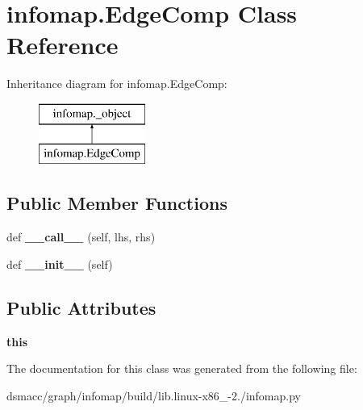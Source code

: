 \hypertarget{classinfomap_1_1EdgeComp}{}\section{infomap.\+Edge\+Comp Class Reference}
\label{classinfomap_1_1EdgeComp}
Inheritance diagram for infomap.\+Edge\+Comp\+:\begin{figure}[H]
\begin{center}
\leavevmode
\includegraphics[height=2.000000cm]{classinfomap_1_1EdgeComp}
\end{center}
\end{figure}
\subsection*{Public Member Functions}
\begin{DoxyCompactItemize}
\item 
\mbox{\label{classinfomap_1_1EdgeComp_ad4447a63e55de9a8667f9fdbe8a98a5d}} 
def {\bfseries \+\_\+\+\_\+call\+\_\+\+\_\+} (self, lhs, rhs)
\item 
\mbox{\label{classinfomap_1_1EdgeComp_ae0e6466f73f74a92a3ada4a05fb9beef}} 
def {\bfseries \+\_\+\+\_\+init\+\_\+\+\_\+} (self)
\end{DoxyCompactItemize}
\subsection*{Public Attributes}
\begin{DoxyCompactItemize}
\item 
\mbox{\label{classinfomap_1_1EdgeComp_a443e8250645499a5636c117777357e13}} 
{\bfseries this}
\end{DoxyCompactItemize}


The documentation for this class was generated from the following file\+:\begin{DoxyCompactItemize}
\item 
dsmacc/graph/infomap/build/lib.\+linux-\/x86\+\_-\/2./infomap.\+py\end{DoxyCompactItemize}

